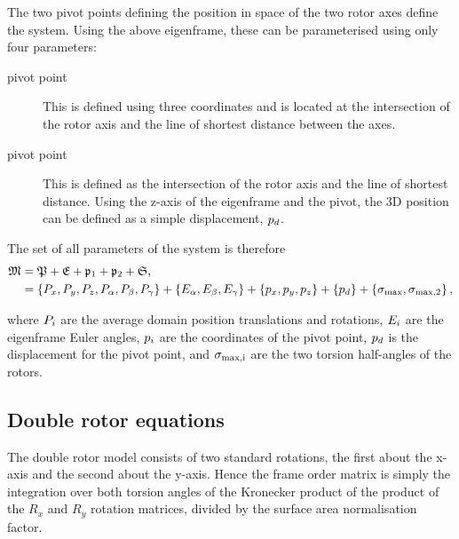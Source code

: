 The two pivot points defining the position in space of the two rotor axes define the system.  Using the above eigenframe, these can be parameterised using only four parameters:
\begin{description}
    \item[ pivot point]  This is defined using three coordinates and is located at the intersection of the  rotor axis and the line of shortest distance between the axes.
    \item[ pivot point]  This is defined as the intersection of the  rotor axis and the line of shortest distance.  Using the z-axis of the eigenframe and the  pivot, the 3D position can be defined as a simple displacement, $p_d$.
\end{description}

The set of all parameters of the system is therefore
\begin{subequations}
\begin{align}
    \mathfrak{M} &= \mathfrak{P} + \mathfrak{E} + \mathfrak{p}_1 + \mathfrak{p}_2 + \mathfrak{S}, \\
              &= \left\{ P_x, P_y, P_z, P_\alpha, P_\beta, P_\gamma \right\} + \left\{ E_\alpha, E_\beta, E_\gamma \right\} + \left\{ p_x, p_y, p_z \right\} + \left\{ p_d \right\} + \left\{ \sigma_\textrm{max}, \sigma_{\textrm{max,2}} \right\},
\end{align}
\end{subequations}

where $P_i$ are the average domain position translations and rotations, $E_i$ are the eigenframe Euler angles, $p_i$ are the coordinates of the  pivot point, $p_d$ is the displacement for the  pivot point, and $\sigma_\textrm{max,i}$ are the two torsion half-angles of the rotors.


\subsection{Double rotor equations}

The double rotor model consists of two standard rotations, the first about the x-axis and the second about the y-axis.
Hence the frame order matrix is simply the integration over both torsion angles of the Kronecker product of the product of the $R_x$ and $R_y$ rotation matrices, divided by the surface area normalisation factor.

